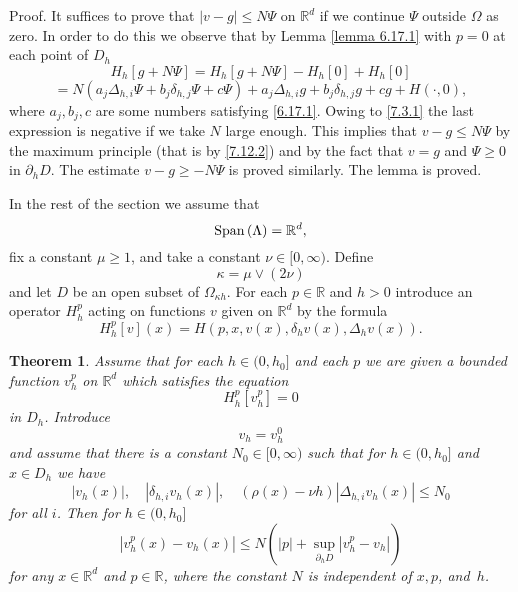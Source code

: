 \documentclass[11pt, reqno]{amsart}
\newtheorem{theorem}{Theorem}[section]
\theoremstyle{definition}
\theoremstyle{remark}
\begin{document}
Proof. It suffices to prove
that $|v -g|\leq N \Psi $ on ${\mathbb{R}}^{d}$ if we continue $\Psi$ outside
$\Omega$ as zero.
 In order to do this
we observe that by Lemma \ref{lemma 6.17.1} with $p=0$
at each point of $D_{h}$
$$
H_{h}[g+N\Psi]=H_{h}[g+N\Psi]-H_{h}[0]+H_{h}[0]
$$
$$
=N(a_{j}\Delta_{h,i}\Psi +  b_{j}\delta_{h,j}\Psi 
+ c\Psi)+ 
a_{j}\Delta_{h,i}g +  b_{j}\delta_{h,j}g 
+ cg+H(\cdot,0),
$$
where $a_{j},b_{j},c $ are some numbers satisfying
\eqref{6.17.1}. Owing to \eqref{7.3.1} the last 
expression is negative if we take $N$ large enough.
This implies that $v -g\leq N \Psi $
 by the maximum principle (that is  by \eqref{7.12.2})
and by the fact that $v =g$ and $\Psi\geq0$
 in $\partial_{h}D$. The estimate $v -g\geq -N\Psi $
is proved similarly. The lemma is proved.

In the rest of the section
we 
assume that 
$$
{\rm Span}\,(\Lambda)={\mathbb{R}}^{d},
$$
fix a  constant  $\mu\geq1$, 
and take a constant  $ \nu\in[0,\infty)$. Define
$$
\kappa=\mu\vee(2\nu)
$$
and let $D$ be an open subset of $\Omega_{\kappa h}$. For each $p\in{\mathbb{R}}$
and $h>0$
introduce an operator $H^{p}_{h}$ acting on functions $v$ given
on ${\mathbb{R}}^{d}$ by the formula
$$
H^{p}_{h}[v](x)=H(p,x,v (x),\delta_{h }v (x),
\Delta_{h}v (x)).
$$

\begin{theorem}
                                   \label{theorem 6.5.1}
Assume that for each $h\in(0,h_{0}]$ and
each $p$ we are given a bounded function  $v^{p}_{h}$ on
${\mathbb{R}}^{d}$ which satisfies the equation
\begin{equation}
                                             \label{6.11.1}
H^{p}_{h}[v^{p}_{h}]=0
\end{equation}
in $D_{h}$. Introduce
$$
  v_{h}=v^{0}_{h} 
$$
and assume that there is a constant $N_{0}\in[0,\infty)$
  such that
for     $h\in(0,h_{0}]$ and $x\in D_{h}$ 
 we have
$$
|v _{h}(x)|,\quad
|\delta_{h,i} v _{h}(x)| ,\quad (\rho (x)-\nu h)
|\Delta_{h,i} v _{h}(x)|\leq N_{0}
$$
for all $i$. Then for  $h\in(0,h_{0}]$ 
\begin{equation}
                                                \label{3.26.06}
|v^{p}_{h}(x)-v_{h}(x)|\leq N (|p|+  \sup_{ \partial_{ h}D}
|v^{p}_{h}-v_{h}| )
\end{equation}
for any $x \in{\mathbb{R}}^{d}$ and $p\in{\mathbb{R}}$,
 where the constant $N$ is independent
of $x,p$, and~$h$.

\end{theorem}
\end{document}
